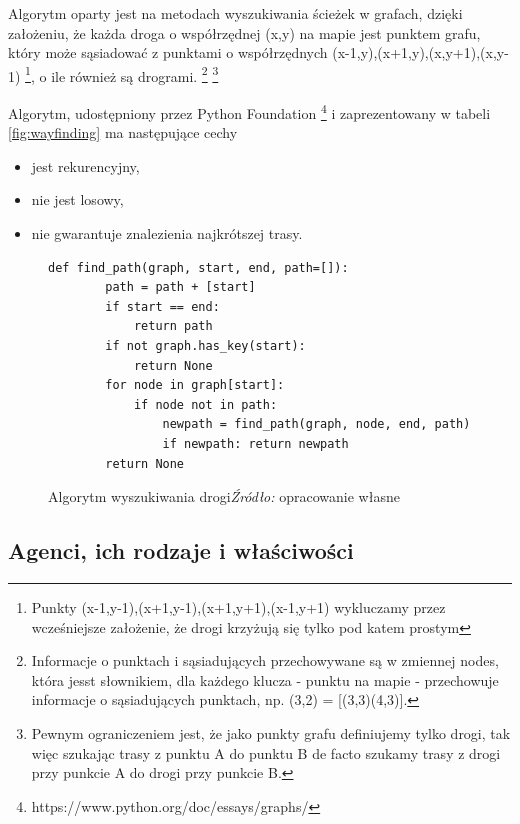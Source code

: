 \documentclass[polish, twoside, 12pt, a4paper]{article}
\theoremstyle{definition}
\theoremstyle{plain}
\theoremstyle{remark}
\begin{document}
Algorytm oparty jest na metodach wyszukiwania ścieżek w grafach, dzięki założeniu, że każda droga o współrzędnej (x,y) na mapie jest punktem grafu, który może sąsiadować z punktami o współrzędnych (x-1,y),(x+1,y),(x,y+1),(x,y-1) \footnote{Punkty (x-1,y-1),(x+1,y-1),(x+1,y+1),(x-1,y+1) wykluczamy przez wcześniejsze założenie, że drogi krzyżują się tylko pod katem prostym}, o ile również są drogrami. \footnote{Informacje o punktach i sąsiadujących przechowywane są w zmiennej nodes, która jesst słownikiem, dla każdego klucza - punktu na mapie - przechowuje informacje o sąsiadujących punktach, np. (3,2) = [(3,3)(4,3)].} \footnote{Pewnym ograniczeniem jest, że jako punkty grafu definiujemy tylko drogi, tak więc szukając trasy z punktu A do punktu B de facto szukamy trasy z drogi przy punkcie A do drogi przy punkcie B.}

Algorytm, udostępniony przez Python Foundation \footnote{https://www.python.org/doc/essays/graphs/} i zaprezentowany w tabeli \ref{fig:wayfinding} ma następujące cechy
	\begin{itemize}
		\item jest rekurencyjny,
		\item nie jest losowy,
		\item nie gwarantuje znalezienia najkrótszej trasy.
	\end{itemize}


\begin{figure}[hbt]
  \centering
\begin{lstlisting}[frame=single, label=szukaniedrogi]  
    def find_path(graph, start, end, path=[]):
        path = path + [start]
        if start == end:
            return path
        if not graph.has_key(start):
            return None
        for node in graph[start]:
            if node not in path:
                newpath = find_path(graph, node, end, path)
                if newpath: return newpath
        return None
\end{lstlisting}
  \captionsetup{margin=10pt,font=small,labelfont=bf,width=.8\textwidth}
  \caption[Algorytm wyszukiwania drogi]{Algorytm wyszukiwania drogi\textit{Źródło:} opracowanie własne}\label{fig:konsument}
\end{figure}


\subsection{Agenci, ich rodzaje i właściwości}
\end{document}
